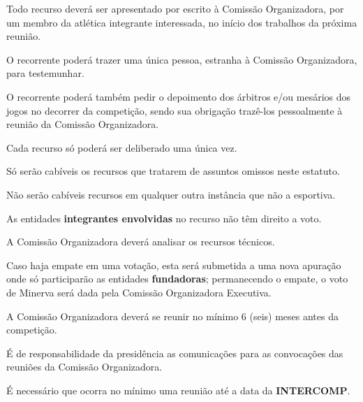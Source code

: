 \begin{article}
	Todo recurso deverá ser apresentado por escrito à Comissão Organizadora, por um membro da atlética integrante interessada, no início dos trabalhos da próxima reunião.

	\begin{xparagraph}
		O recorrente poderá trazer uma única pessoa, estranha à Comissão Organizadora, para testemunhar.
	\end{xparagraph}

	\begin{xparagraph}
		O recorrente poderá também pedir o depoimento dos árbitros e/ou mesários dos jogos no decorrer da competição, sendo sua obrigação trazê-los pessoalmente à reunião da Comissão Organizadora.
	\end{xparagraph}

	\begin{xparagraph}
		Cada recurso só poderá ser deliberado uma única vez.
	\end{xparagraph}

	\begin{xparagraph}
		Só serão cabíveis os recursos que tratarem de assuntos omissos neste estatuto.
	\end{xparagraph}

	\begin{xparagraph}
		Não serão cabíveis recursos em qualquer outra instância que não a esportiva.
	\end{xparagraph}

	\begin{xparagraph}
		As entidades \textbf{integrantes envolvidas} no recurso não têm direito a voto.
	\end{xparagraph}

	\begin{xparagraph}
		A Comissão Organizadora deverá analisar os recursos técnicos.
	\end{xparagraph}

	\begin{xparagraph}
		Caso haja empate em uma votação, esta será submetida a uma nova apuração onde só participarão as entidades \textbf{fundadoras}; permanecendo o empate, o voto de Minerva será dada pela Comissão Organizadora Executiva.
	\end{xparagraph}
\end{article}

\begin{article}
	A Comissão Organizadora deverá se reunir no mínimo 6 (seis) meses antes da competição.

	\begin{xparagraph}
		É de responsabilidade da presidência as comunicações para as convocações das reuniões da Comissão Organizadora.
	\end{xparagraph}

	\begin{xparagraph}
		É necessário que ocorra no mínimo uma reunião até a data da \textbf{INTERCOMP}.
	\end{xparagraph}
\end{article}

